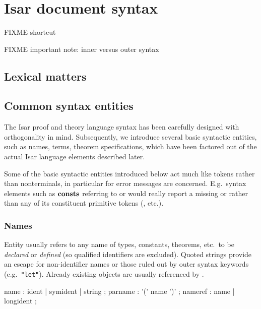 


\chapter{Isar document syntax}

FIXME shortcut

FIXME important note: inner versus outer syntax

\section{Lexical matters}

\section{Common syntax entities}

The Isar proof and theory language syntax has been carefully designed with
orthogonality in mind.  Subsequently, we introduce several basic syntactic
entities, such as names, terms, theorem specifications, which have been
factored out of the actual Isar language elements described later.

Some of the basic syntactic entities introduced below act much like tokens
rather than nonterminals, in particular for error messages are concerned.
E.g.\ syntax elements such as ${\mathord{\mathbf{consts}}}$ referring to  or
 would really report a missing  or
 rather than any of its constituent primitive tokens
(,  etc.).


\subsection{Names}

Entity  usually refers to any name of types, constants,
theorems, etc.\ to be \emph{declared} or \emph{defined} (so qualified
identifiers are excluded).  Quoted strings provide an escape for
non-identifier names or those ruled out by outer syntax keywords (e.g.\ 
\verb|"let"|).  Already existing objects are usually referenced by
\railqtoken{nameref}.

\begin{rail}
  name : ident | symident | string
  ;
  parname : '(' name ')'
  ;
  nameref : name | longident
  ;
\end{rail}


